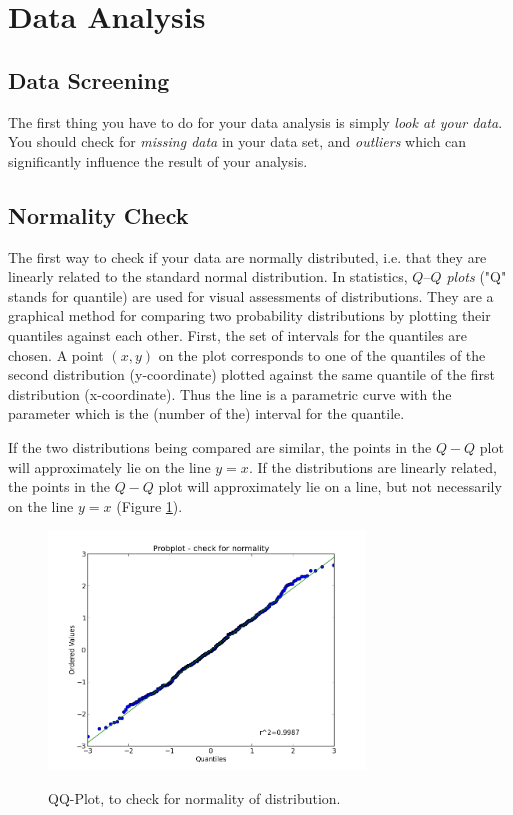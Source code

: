
\section{Data Analysis}

\subsection{Data Screening}

The first thing you have to do for your data analysis is simply \emph{look at your data}. You should check for \emph{missing data} in your data set, and \emph{outliers} which can significantly influence the result of your analysis.

\subsection{Normality Check}  
The first way to check if your data are normally distributed, i.e. that they are linearly related to the standard normal distribution. In statistics, \emph{$Q–Q$ plots} ("Q" stands for quantile) are used for visual assessments of distributions. They are a graphical method for comparing two probability distributions by plotting their quantiles against each other. First, the set of intervals for the quantiles are chosen. A point $(x,y)$ on the plot corresponds to one of the quantiles of the second distribution (y-coordinate) plotted against the same quantile of the first distribution (x-coordinate). Thus the line is a parametric curve with the parameter which is the (number of the) interval for the quantile.

If the two distributions being compared are similar, the points in the $Q-Q$ plot will approximately lie on the line $y = x$. If the distributions are linearly related, the points in the $Q-Q$ plot will approximately lie on a line, but not necessarily on the line $y = x$ (Figure \ref{fig:qqplot}).

\begin{figure}
  \centering
  \includegraphics[width=0.75\textwidth]{../Images/ProbPlot.png}\\
  \caption{QQ-Plot, to check for normality of distribution.}\label{fig:qqplot}
\end{figure}

